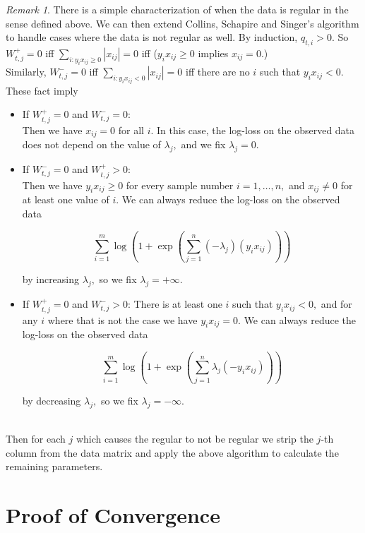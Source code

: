 \documentclass[BSc]{usydthesis}
\numberwithin{equation}{chapter}
\theoremstyle{remark}
\newtheorem{Remark}[equation]{Remark}
\begin{document}
\begin{Remark}
 There is a simple characterization of when the data is regular in the sense defined above. We can then extend Collins, Schapire and Singer's algorithm to handle cases where the data is not regular as well. By induction, $q_{t,i}>0.$ So $W^+_{t,j} = 0$ iff $\sum_{i: y_i x_{ij} \geq 0} |x_{ij}| = 0$ iff ($y_i x_{ij} \geq 0 $ implies $x_{ij}=0.$) \
\\
Similarly, $W^-_{t,j} = 0 $ iff $\sum_{i: y_i x_{ij} < 0} |x_{ij}| = 0 $ iff there are no $i$ such that $y_i x_{ij}<0.$ These fact imply
\\

\begin{itemize}
 \item If $W^+_{t,j} =0$ and $ W^-_{t,j} = 0$:\\
 Then we have $x_{ij}=0$ for all $i.$ In this case, the log-loss on the observed data does not depend on the value of $\lambda_j,$ and we fix $\lambda_j = 0.$
 \item If $W^-_{t,j}=0$ and $W^+_{t,j}>0$: \\
 Then we have $y_i x_{ij} \geq 0$ for every sample number $i=1,\ldots, n,$ and $x_{ij}\neq 0$ for at least one value of $i.$ We can always reduce the log-loss on the observed data

$$\sum_{i=1}^m \log\left(1+\exp\left(\sum_{j=1}^n (-\lambda_j) (y_i x_{ij})\right)\right)$$

by increasing $\lambda_j,$ so we fix $\lambda_j= +\infty.$
 \item If $W^+_{t,j}=0$ and $W^-_{t,j}>0$: There is at least one $i$ such that $y_i x_{ij} < 0,$ and for any $i$ where that is not the case we have $y_i x_{ij} = 0.$ We can always reduce the log-loss on the observed data

$$\sum_{i=1}^m \log\left(1+\exp\left(\sum_{j=1}^n \lambda_j (-y_i x_{ij})\right)\right)$$

by decreasing $\lambda_j,$ so we fix $\lambda_j= -\infty.$
\end{itemize}\ \\
Then for each $j$ which causes the regular to not be regular we strip the $j$-th column from the data matrix and apply the above algorithm to calculate the remaining parameters. 
\end{Remark}

\section{Proof of Convergence}
\end{document}
